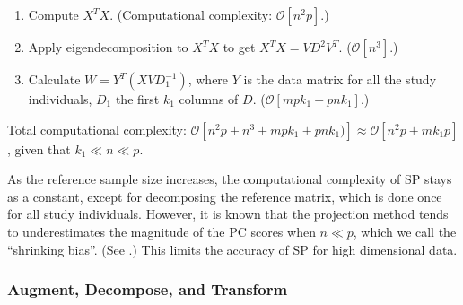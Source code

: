 \documentclass{article}
\newcommand{\bO}{\mathcal{O}}
\begin{document}
\begin{enumerate}
\item Compute $X^T X$.
  (Computational complexity: $\bO[n^2p]$.)  
\item Apply eigendecomposition to $X^T X$ to get $X^T X = V D^2 V^T$.
  ($\bO[n^3]$.)
\item Calculate $W = Y^T (X V D_1^{-1})$, where $Y$ is the data matrix for all the study individuals, $D_1$ the first $k_1$ columns of $D$. ($\bO[mpk_1 + pnk_1]$.)
\end{enumerate}

Total computational complexity: $\bO[n^2p + n^3 + mpk_1 + pnk_1)] \approx \bO[n^2p + mk_1p]$,
given that $k_1 \ll n \ll p$.

As the reference sample size increases,
the computational complexity of SP stays as a constant,
except for decomposing the reference matrix, which is done once for all study individuals.
However, it is known that the projection method tends to underestimates the magnitude of the PC scores when $n \ll p$,
which we call the ``shrinking bias''. (See \cite{dey}.)
This limits the accuracy of SP for high dimensional data.

\subsubsection{Augment, Decompose, and Transform}
\end{document}

